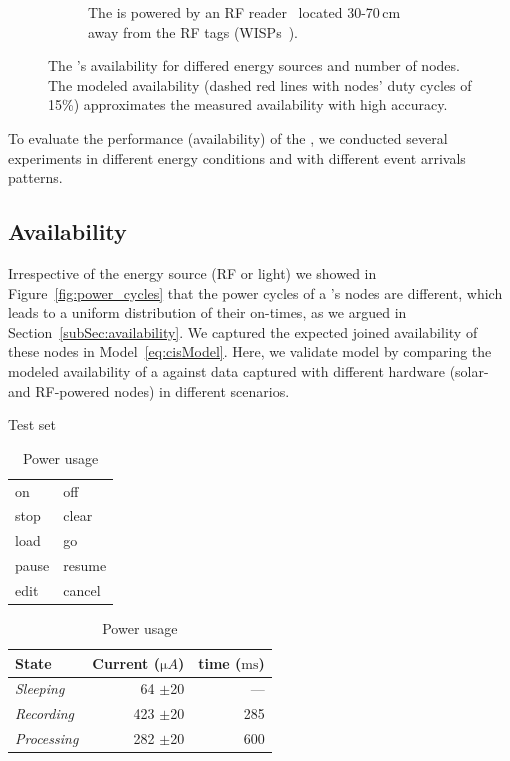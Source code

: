 \begin{figure}[h]
\begin{subfigure}{.66\columnwidth}
                \caption{The \cis is powered by an RF reader~\cite{r420_website} located 30-70\,cm away from the RF tags (WISPs~\cite{smith2006wirelessly}).}
            \label{fig:rfPwrCIS}
        \end{subfigure}
        \caption{The \fullcis's availability for differed energy sources and number of nodes. 
        The modeled availability (dashed red lines with nodes' duty cycles of 15\%) approximates the measured availability with high accuracy.}
        \label{fig:pwrCIS}
\end{figure} 
To evaluate the performance (availability) of the \fullcis, we conducted several experiments in different energy conditions and with different event arrivals patterns. 
%
\subsection{Availability}
Irrespective of the energy source (RF or light) we showed in Figure~\ref{fig:power_cycles} that the power cycles of a \cis's nodes are different, which leads to a uniform distribution of their on-times, as we argued in Section~\ref{subSec:availability}. We captured the expected joined availability of these nodes in Model~\ref{eq:cisModel}.  Here, we validate model by comparing the modeled availability of a \cis against data captured with different hardware (solar- and RF-powered nodes) in different scenarios.
%
\begin{table}[t]
\parbox{.32\linewidth}{
    \caption{Test set \ \ \ \hfill }
    \label{tab:words}
    \begin{tabular}{ll}
        \hline
        on    & off  \\ 
        stop & clear \\ 
        load   & go \\ 
        pause & resume \\ 
        edit  & cancel  \\  
        \hline  
    \end{tabular}
    } \hfill
    \parbox{.66\linewidth}{
        \caption{Power usage}
        \label{tab:power_usage}
        \begin{tabular}{lrr}\hline
            \textbf{State} & \textbf{Current ($\si{\micro A}$)} & \textbf{time ($\si{\milli\second}$)} \\[10pt]\hline
            \textit{Sleeping} & 64 $\pm$20 & --- \\
            \textit{Recording} & 423 $\pm$20 & 285   \\
            \textit{Processing} &  282 $\pm$20 & 600\\ 
            \hline
        \end{tabular}
    }
\end{table}
